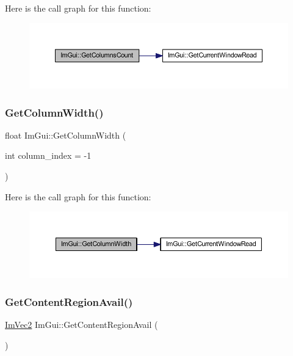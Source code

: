 Here is the call graph for this function\+:
\nopagebreak
\begin{figure}[H]
\begin{center}
\leavevmode
\includegraphics[width=350pt]{namespace_im_gui_a3c2998ad9527948a4e4166c4f7db9ec9_cgraph}
\end{center}
\end{figure}
\mbox{\label{namespace_im_gui_a3d205d86dab5ca0763a92997283ac36e}} 
\subsubsection{\texorpdfstring{Get\+Column\+Width()}{GetColumnWidth()}}
{\footnotesize\ttfamily float Im\+Gui\+::\+Get\+Column\+Width (\begin{DoxyParamCaption}\item[{int}]{column\+\_\+index = {\ttfamily -\/1} }\end{DoxyParamCaption})}

Here is the call graph for this function\+:
\nopagebreak
\begin{figure}[H]
\begin{center}
\leavevmode
\includegraphics[width=350pt]{namespace_im_gui_a3d205d86dab5ca0763a92997283ac36e_cgraph}
\end{center}
\end{figure}
\mbox{\label{namespace_im_gui_a410c8e19b2fea8b52746ca11b3930301}} 
\subsubsection{\texorpdfstring{Get\+Content\+Region\+Avail()}{GetContentRegionAvail()}}
{\footnotesize\ttfamily \mbox{\hyperlink{struct_im_vec2}{Im\+Vec2}} Im\+Gui\+::\+Get\+Content\+Region\+Avail (\begin{DoxyParamCaption}{ }\end{DoxyParamCaption})}

